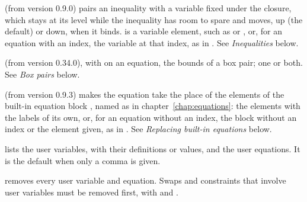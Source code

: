 \begin{optdesc}
\item[\optarg{}{perp}{variable\textup{[}\texttt{, up}|\texttt{down}\textup{]}}]
(from version 0.9.0) pairs an inequality with a variable fixed under the
closure, which stays at its level while the inequality has room to spare and
moves, up (the default) or down, when it binds.  is a variable
element, such as  or , or, for an equation with an
index, the variable at that index, as in . See
\emph{Inequalities} below.

\item[\optarg{low}{er}{\#}, \optarg{up}{per}{\#}] (from version 0.34.0), with
 on an equation, the bounds of a box pair; one or both. See
\emph{Box pairs} below.

\item[\optarg{}{replace}{block}] (from version 0.9.3) makes the equation
take the place of the elements of the built-in equation block ,
named as in chapter~\ref{chap:equations}: the elements with the labels of its
own, or, for an equation without an index, the block without an index or the
element given, as in . See \emph{Replacing built-in
equations} below.

\item[\opt{}{list}] lists the user variables, with their definitions or
values, and the user equations. It is the default when only a comma is given.

\item[\opt{}{clear}] removes every user variable and equation. Swaps and
constraints that involve user variables must be removed first, with
 and .
\end{optdesc}




